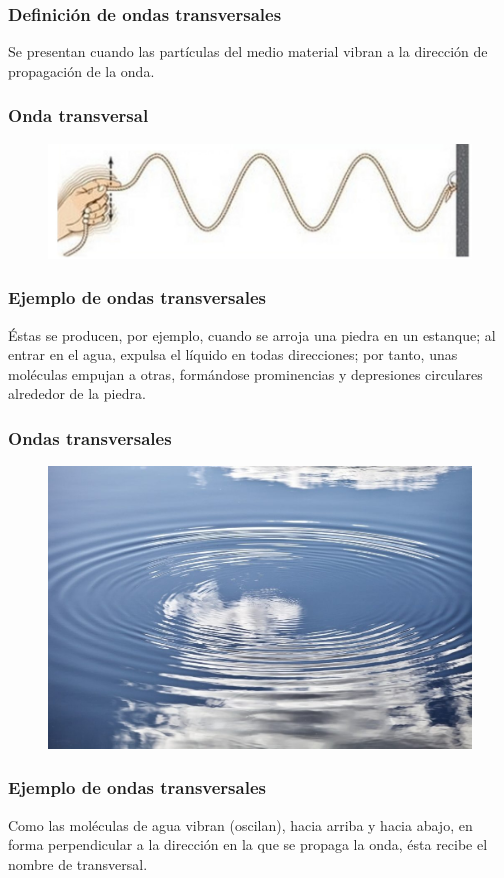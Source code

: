 \documentclass[14pt]{beamer}
\begin{document}
\begin{frame}
\frametitle{Definición de ondas transversales}
Se presentan cuando las partículas del medio material vibran  a la dirección de propagación de la onda.
\end{frame}
\begin{frame}
\frametitle{Onda transversal}
\begin{figure}
    \centering
    \includegraphics[scale=0.35]{Imagenes/Ondas_08.jpg}
\end{figure}
\end{frame}
\begin{frame}
\frametitle{Ejemplo de ondas transversales}
Éstas se producen, por ejemplo, cuando se arroja una piedra en un estanque; \pause al entrar en el agua, expulsa el líquido en todas direcciones; \pause por tanto, unas moléculas empujan a otras, formándose prominencias y depresiones circulares alrededor de la piedra.
\end{frame}
\begin{frame}
\frametitle{Ondas transversales}
\begin{figure}
    \centering
    \includegraphics[scale=0.25]{Imagenes/Ondas_06.jpg}
\end{figure}
\end{frame}
\begin{frame}
\frametitle{Ejemplo de ondas transversales}
Como las moléculas de agua vibran (oscilan), hacia arriba y hacia abajo, en forma perpendicular
a la dirección en la que se propaga la onda, \pause ésta recibe el nombre de transversal.
\end{frame}
\end{document}
